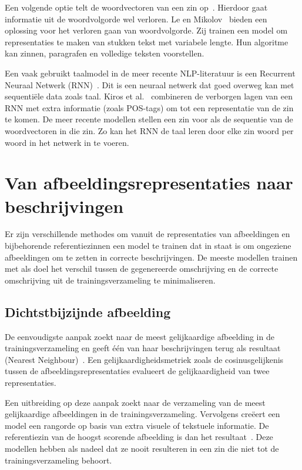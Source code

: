  Een volgende optie telt de woordvectoren van een zin op~\cite{Lebret2013}.  Hierdoor gaat informatie uit de woordvolgorde wel verloren. Le en Mikolov~\cite{Le2014a} bieden een oplossing voor het verloren gaan van woordvolgorde. Zij trainen een model om representaties te maken van stukken tekst met variabele lengte. Hun algoritme kan zinnen, paragrafen en volledige teksten voorstellen.

 Een vaak gebruikt taalmodel in de meer recente NLP-literatuur is een Recurrent Neuraal Netwerk (RNN)~\cite{Mikolov2010}. Dit is een neuraal netwerk dat goed overweg kan met sequenti\"ele data zoals taal. Kiros et al.~\cite{Kiros2013} combineren de verborgen lagen van een RNN met extra informatie (zoals POS-tags) om tot een representatie van de zin te komen. De meer recente modellen stellen een zin voor als de sequentie van de woordvectoren in die zin. Zo kan het RNN de taal leren door elke zin woord per woord in het netwerk in te voeren.
 
\section{Van afbeeldingsrepresentaties naar beschrijvingen}
Er zijn verschillende methodes om vanuit de representaties van afbeeldingen en bijbehorende referentiezinnen een model te trainen dat in staat is om ongeziene afbeeldingen om te zetten in correcte beschrijvingen. 
De meeste modellen trainen met als doel het verschil tussen de gegenereerde omschrijving en de correcte omschrijving uit de trainingsverzameling te minimaliseren.

\subsection{Dichtstbijzijnde afbeelding}
De eenvoudigste aanpak zoekt naar de meest gelijkaardige afbeelding in de trainingsverzameling en geeft \'e\'en van haar beschrijvingen terug als resultaat (Nearest Neighbour)~\cite{Devlin2015a}. Een gelijkaardigheidsmetriek zoals de cosinusgelijkenis tussen de afbeeldingsrepresentaties evalueert de gelijkaardigheid van twee representaties.

Een uitbreiding op deze aanpak zoekt naar de verzameling van de meest gelijkaardige afbeeldingen in de trainingsverzameling. Vervolgens cre\"eert een model een rangorde op basis van extra visuele of tekstuele informatie. De referentiezin van de hoogst scorende afbeelding is dan het resultaat~\cite{Devlin2015a,Hodosh2013,Oliva2006,Ordonez2011}. 
Deze modellen hebben als nadeel dat ze nooit resulteren in een zin die niet tot de trainingsverzameling behoort.


